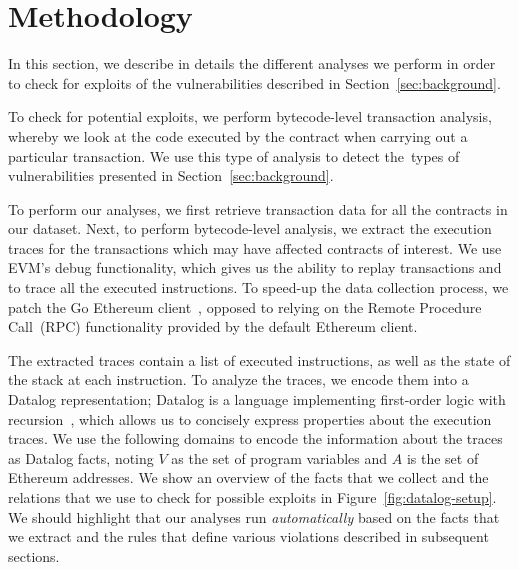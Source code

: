 

\section{Methodology}
\label{sec:methodology}

In this section, we describe in details the different analyses we perform in order to check for exploits of the vulnerabilities described in Section~\ref{sec:background}.

To check for potential exploits, we perform bytecode-level transaction analysis, whereby we look at the code executed by the contract when carrying out a particular transaction. We use this type of analysis to detect the~\VulnTypes types of vulnerabilities presented in Section~\ref{sec:background}.

To perform our analyses, we first retrieve transaction data for all the contracts in our dataset. Next, to perform bytecode-level analysis, we extract the execution traces for the transactions which may have affected contracts of interest. We use EVM's debug functionality, which gives us the ability to replay transactions and to trace all the executed instructions. To speed-up the data collection process, we patch the Go Ethereum client~\cite{go-ethereum}, opposed to relying on the Remote Procedure Call~(RPC) functionality provided by the default Ethereum client.

The extracted traces contain a list of executed instructions, as well as the state of the stack at each instruction.
To analyze the traces, we encode them into a Datalog representation; Datalog is a language implementing first-order logic with recursion~\cite{Immerman99descriptivecomplexity}, which allows us to concisely express properties about the execution traces.
We use the following domains to encode the information about the traces as Datalog facts, noting $V$ as the set of program variables and $A$ is the set of Ethereum addresses.
We show an overview of the facts that we collect and the relations that we use to check for possible exploits in Figure~\ref{fig:datalog-setup}.
We should highlight that our analyses run \emph{automatically} based on the facts that we extract and the rules that define various violations described in subsequent sections. 

